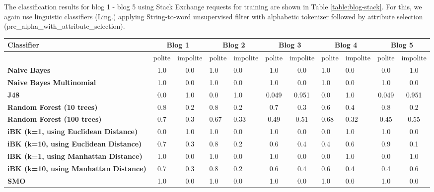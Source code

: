 \documentclass[conference]{IEEEtran}
\begin{document}
The classification results for blog 1 - blog 5 using Stack Exchange requests for training are shown in Table \ref{table:blog-stack}. For this, we again use linguistic classifiers (Ling.) applying String-to-word unsupervised filter with alphabetic tokenizer followed by attribute selection (pre\_alpha\_with\_attribute\_selection). 

\begin{table*}[htbp]
\caption{Classification results using Stack Exchange requests for training for blog 1 - blog 5}
\centering
\vspace{5pt}
\begin{tabular}{|l|c|c|l|l|c|c|l|l|c|c|}
\hline
\textbf{Classifier} & \multicolumn{2}{|c|}{\textbf{Blog 1}} & \multicolumn{2}{|c|}{\textbf{Blog 2}} & \multicolumn{2}{|c|}{\textbf{Blog 3}} & \multicolumn{2}{|c|}{\textbf{Blog 4}} & \multicolumn{2}{|c|}{\textbf{Blog 5}} \\
\hline
& polite & impolite & polite & impolite & polite & impolite & polite & impolite & polite & impolite \\
\hline\hline
\textbf{Naive Bayes} & 1.0 & 0.0 & 1.0 & 0.0 & 1.0 & 0.0 & 1.0 & 0.0 & 0.0 & 1.0 \\ 
\hline
\textbf{Naive Bayes Multinomial} & 1.0 & 0.0 & 1.0 & 0.0 & 1.0 & 0.0 & 1.0 & 0.0 & 1.0 & 0.0 \\ 
\hline
\textbf{J48} & 0.0 & 1.0 & 0.0 & 1.0 & 0.049 & 0.951 & 0.0 & 1.0 & 0.049 & 0.951 \\ 
\hline
\textbf{Random Forest (10 trees)} & 0.8 & 0.2 & 0.8 & 0.2 & 0.7 & 0.3 & 0.6 & 0.4 & 0.8 & 0.2 \\ 
\hline
\textbf{Random Forest (100 trees)} & 0.7 & 0.3 & 0.67 & 0.33 & 0.49 & 0.51 & 0.68 & 0.32 & 0.45 & 0.55 \\ 
\hline
\textbf{iBK (k=1, using Euclidean Distance)} & 0.0 & 1.0 & 1.0 & 0.0 & 1.0 & 0.0 & 0.0 & 1.0 & 1.0 & 0.0 \\ 
\hline
\textbf{iBK (k=10, using Euclidean Distance)} & 0.7 & 0.3 & 0.8 & 0.2 & 0.6 & 0.4 & 0.4 & 0.6 & 0.9 & 0.1 \\ 
\hline
\textbf{iBK (k=1, using Manhattan Distance)} & 1.0 & 0.0 & 1.0 & 0.0 & 1.0 & 0.0 & 0.0 & 1.0 & 0.0 & 1.0 \\ 
\hline
\textbf{iBK (k=10, using Manhattan Distance)} & 0.7 & 0.3 & 0.8 & 0.2 & 0.6 & 0.4 & 0.6 & 0.4 & 0.4 & 0.6 \\ 
\hline
\textbf{SMO} & 1.0 & 0.0 & 1.0 & 0.0 & 1.0 & 0.0 & 1.0 & 0.0 & 1.0 & 0.0 \\ 
\hline
\hline
\end{tabular}
\label{table:blog-stack}
\end{table*}
\end{document}
